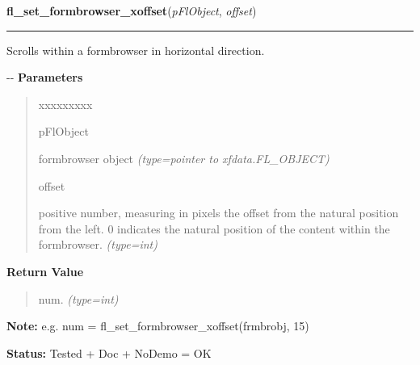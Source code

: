     \vspace{0.5ex}

\hspace{.8\funcindent}\begin{boxedminipage}{\funcwidth}

    \raggedright \textbf{fl\_set\_formbrowser\_xoffset}(\textit{pFlObject}, \textit{offset})

    \vspace{-1.5ex}

    \rule{\textwidth}{0.5\fboxrule}
\setlength{\parskip}{2ex}

Scrolls within a formbrowser in horizontal direction.

-{}-
\setlength{\parskip}{1ex}
      \textbf{Parameters}
      \vspace{-1ex}

      \begin{quote}
        \begin{Ventry}{xxxxxxxxx}

          \item[pFlObject]


formbrowser object
            {\it (type=pointer to xfdata.FL\_OBJECT)}

          \item[offset]


positive number, measuring in pixels the offset from the natural
position from the left. 0 indicates the natural position of the
content within the formbrowser.
            {\it (type=int)}

        \end{Ventry}

      \end{quote}

      \textbf{Return Value}
    \vspace{-1ex}

      \begin{quote}

num.
      {\it (type=int)}

      \end{quote}

\textbf{Note:} 
e.g. num = fl\_set\_formbrowser\_xoffset(frmbrobj, 15)


\textbf{Status:} 
Tested + Doc + NoDemo = OK


    \end{boxedminipage}

    \label{xformslib:flformbrowser:fl_set_formbrowser_yoffset}


